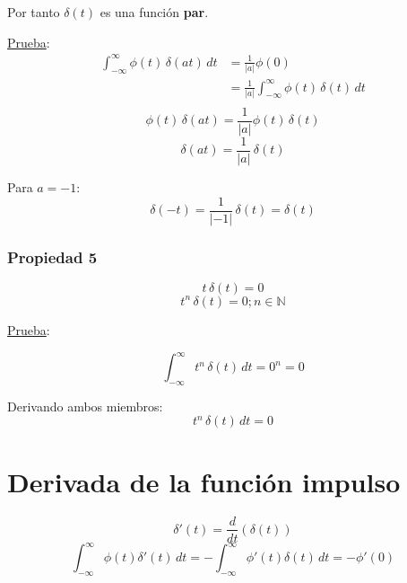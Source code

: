 Por tanto $\delta(t)$ es una función \textbf{par}.

\underline{Prueba}:
\begin{equation*}
\begin{split}
    \int_{-\infty}^{\infty}\phi(t)\,\delta(at)\,dt
        &=\frac{1}{|a|}\phi(0)\\
        &=\frac{1}{|a|}\int_{-\infty}^{\infty}\phi(t)\,\delta(t)\,dt\\
\end{split}
\end{equation*}
\begin{equation*}
    \phi(t)\,\delta(at)=\frac{1}{|a|}\phi(t)\,\delta(t)
\end{equation*}
\begin{equation*}
    \delta(at)=\frac{1}{|a|}\,\delta(t)
\end{equation*}

Para $a=-1$:
\begin{equation*}
    \delta(-t)=\frac{1}{|-1|}\,\delta(t)=\delta(t)
\end{equation*}

\subsubsection*{Propiedad 5}
\begin{equation*}
    t\,\delta(t)=0
\end{equation*}
\begin{equation}
    t^n\,\delta(t)=0;n\in\mathbb{N}
\end{equation}

\underline{Prueba}:

\begin{equation*}
    \int_{-\infty}^{\infty}t^n\,\delta(t)\,dt=0^n=0
\end{equation*}

Derivando ambos miembros:
\begin{equation*}
    t^n\,\delta(t)\,dt=0
\end{equation*}

\section{Derivada de la función impulso}
\begin{equation*}
    \delta'(t)=\frac{d}{dt}(\delta(t))
\end{equation*}
\begin{equation}
    \int_{-\infty}^{\infty}\phi(t)\delta'(t)\,dt
        =-\int_{-\infty}^{\infty}\phi'(t)\delta(t)\,dt
        =-\phi'(0)
\end{equation}

